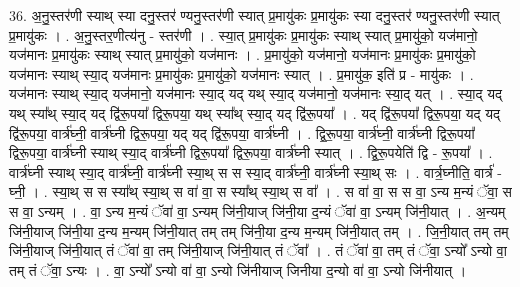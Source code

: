 \documentclass[17pt]{extarticle}
\begin{document}
36. अ॒नु॒स्तर॑णी स्याथ् स्या दनु॒स्तर॑ ण्यनु॒स्तर॑णी स्यात् प्र॒मायु॑कः प्र॒मायु॑कः स्या दनु॒स्तर॑ ण्यनु॒स्तर॑णी स्यात् प्र॒मायु॑कः । . अ॒नु॒स्तर॒णीत्य॑नु - स्तर॑णी । . स्या॒त् प्र॒मायु॑कः प्र॒मायु॑कः स्याथ् स्यात् प्र॒मायु॑को॒ यज॑मानो॒ यज॑मानः प्र॒मायु॑कः स्याथ् स्यात् प्र॒मायु॑को॒ यज॑मानः । . प्र॒मायु॑को॒ यज॑मानो॒ यज॑मानः प्र॒मायु॑कः प्र॒मायु॑को॒ यज॑मानः स्याथ् स्या॒द् यज॑मानः प्र॒मायु॑कः प्र॒मायु॑को॒ यज॑मानः स्यात् । . प्र॒मायु॑क॒ इति॑ प्र - मायु॑कः । . यज॑मानः स्याथ् स्या॒द् यज॑मानो॒ यज॑मानः स्या॒द् यद् यथ् स्या॒द् यज॑मानो॒ यज॑मानः स्या॒द् यत् । . स्या॒द् यद् यथ् स्या᳚थ् स्या॒द् यद् द्वि॑रू॒पया᳚ द्विरू॒पया॒ यथ् स्या᳚थ् स्या॒द् यद् द्वि॑रू॒पया᳚ । . यद् द्वि॑रू॒पया᳚ द्विरू॒पया॒ यद् यद् द्वि॑रू॒पया॒ वार्त्र॑घ्नी॒ वार्त्र॑घ्नी द्विरू॒पया॒ यद् यद् द्वि॑रू॒पया॒ वार्त्र॑घ्नी । . द्वि॒रू॒पया॒ वार्त्र॑घ्नी॒ वार्त्र॑घ्नी द्विरू॒पया᳚ द्विरू॒पया॒ वार्त्र॑घ्नी स्याथ् स्या॒द् वार्त्र॑घ्नी द्विरू॒पया᳚ द्विरू॒पया॒ वार्त्र॑घ्नी स्यात् । . द्वि॒रू॒पयेति॑ द्वि - रू॒पया᳚ । . वार्त्र॑घ्नी स्याथ् स्या॒द् वार्त्र॑घ्नी॒ वार्त्र॑घ्नी स्या॒थ् स स स्या॒द् वार्त्र॑घ्नी॒ वार्त्र॑घ्नी स्या॒थ् सः । . वार्त्र॒घ्नीति॒ वार्त्र॑ - घ्नी॒ । . स्या॒थ् स स स्या᳚थ् स्या॒थ् स वा॑ वा॒ स स्या᳚थ् स्या॒थ् स वा᳚ । . स वा॑ वा॒ स स वा॒ ऽन्य म॒न्यं ॅवा॒ स स वा॒ ऽन्यम् । . वा॒ ऽन्य म॒न्यं ॅवा॑ वा॒ ऽन्यम् जि॑नी॒याज् जि॑नी॒या द॒न्यं ॅवा॑ वा॒ ऽन्यम् जि॑नी॒यात् । . अ॒न्यम् जि॑नी॒याज् जि॑नी॒या द॒न्य म॒न्यम् जि॑नी॒यात् तम् तम् जि॑नी॒या द॒न्य म॒न्यम् जि॑नी॒यात् तम् । . जि॒नी॒यात् तम् तम् जि॑नी॒याज् जि॑नी॒यात् तं ॅवा॑ वा॒ तम् जि॑नी॒याज् जि॑नी॒यात् तं ॅवा᳚ । . तं ॅवा॑ वा॒ तम् तं ॅवा॒ ऽन्यो᳚ ऽन्यो वा॒ तम् तं ॅवा॒ ऽन्यः । . वा॒ ऽन्यो᳚ ऽन्यो वा॑ वा॒ ऽन्यो जि॑नीयाज् जिनीया द॒न्यो वा॑ वा॒ ऽन्यो जि॑नीयात् । \newline
\end{document}
